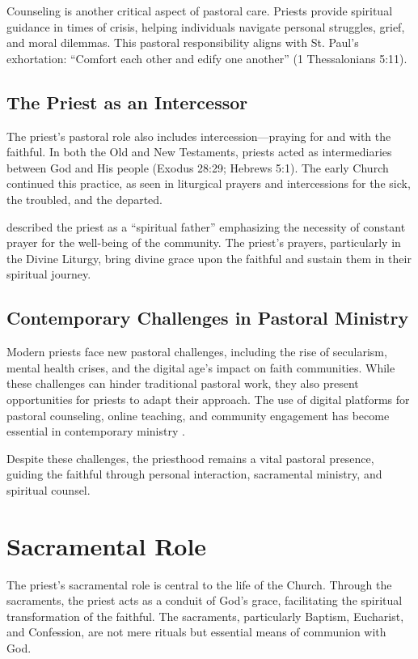 \documentclass[12pt, doc]{apa7}   	%
\begin{document}
Counseling is another critical aspect of pastoral care. Priests provide spiritual guidance in times of crisis, helping individuals navigate personal struggles, grief, and moral dilemmas. This pastoral responsibility aligns with St. Paul’s exhortation: ``Comfort each other and edify one another'' (1 Thessalonians 5:11).

\subsection{The Priest as an Intercessor}

The priest’s pastoral role also includes intercession—praying for and with the faithful. In both the Old and New Testaments, priests acted as intermediaries between God and His people (Exodus 28:29; Hebrews 5:1). The early Church continued this practice, as seen in liturgical prayers and intercessions for the sick, the troubled, and the departed.

\citet{priests_zacharias} described the priest as a ``spiritual father'' emphasizing the necessity of constant prayer for the well-being of the community. The priest’s prayers, particularly in the Divine Liturgy, bring divine grace upon the faithful and sustain them in their spiritual journey.

\subsection{Contemporary Challenges in Pastoral Ministry}

Modern priests face new pastoral challenges, including the rise of secularism, mental health crises, and the digital age’s impact on faith communities. While these challenges can hinder traditional pastoral work, they also present opportunities for priests to adapt their approach. The use of digital platforms for pastoral counseling, online teaching, and community engagement has become essential in contemporary ministry \citep{orthodox_church_ware}. 

Despite these challenges, the priesthood remains a vital pastoral presence, guiding the faithful through personal interaction, sacramental ministry, and spiritual counsel.

\section{Sacramental Role}\label{sacramental}

The priest’s sacramental role is central to the life of the Church. Through the sacraments, the priest acts as a conduit of God’s grace, facilitating the spiritual transformation of the faithful. The sacraments, particularly Baptism, Eucharist, and Confession, are not mere rituals but essential means of communion with God.
\end{document}
